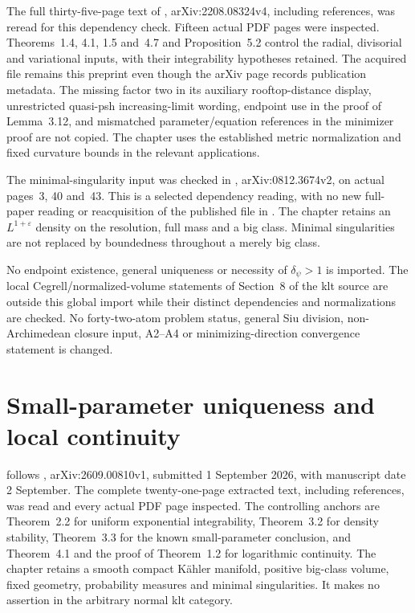 The full thirty-five-page text of
\cite{DarvasZhang24TwistedV4}, arXiv:2208.08324v4, including
references, was reread for this dependency check. Fifteen actual
PDF pages were inspected. Theorems~1.4, 4.1, 1.5 and~4.7 and
Proposition~5.2 control the radial, divisorial and variational
inputs, with their integrability hypotheses retained. The acquired
file remains this preprint even though the arXiv page records
publication metadata. The missing factor two in its auxiliary
rooftop-distance display, unrestricted quasi-psh increasing-limit
wording, endpoint use in the proof of Lemma~3.12, and mismatched
parameter/equation references in the minimizer proof are not copied.
The chapter uses the established metric normalization and fixed
curvature bounds in the relevant applications.

The minimal-singularity input was checked in
\cite[Theorem~B and Theorem~4.1]{BEGZ10BigV2},
arXiv:0812.3674v2, on actual pages~3, 40 and~43.
This is a selected dependency reading, with no new full-paper
reading or reacquisition of the published file in \cite{BEGZ10}.
The chapter retains an $L^{1+\varepsilon}$ density on the
resolution, full mass and a big class. Minimal singularities are
not replaced by boundedness throughout a merely big class.

No endpoint existence, general uniqueness or necessity of
$\delta_\psi>1$ is imported. The local Cegrell/normalized-volume
statements of Section~8 of the klt source are outside this global
import while their distinct dependencies and normalizations are
checked. No forty-two-atom problem status, general Siu division,
non-Archimedean closure input, A2--A4 or minimizing-direction
convergence statement is changed.

\section{Small-parameter uniqueness and local continuity}
\label{sec:provenance-big-small-uniqueness}

 follows
\cite{DangZhangZhou26UniquenessV1}, arXiv:2609.00810v1,
submitted 1 September 2026, with manuscript date 2 September.
The complete twenty-one-page extracted text, including references,
was read and every actual PDF page inspected. The controlling
anchors are Theorem~2.2 for uniform exponential integrability,
Theorem~3.2 for density stability, Theorem~3.3 for the known
small-parameter conclusion, and Theorem~4.1 and the proof of
Theorem~1.2 for logarithmic continuity. The chapter retains a
smooth compact K\"ahler manifold, positive big-class volume,
fixed geometry, probability measures and minimal singularities.
It makes no assertion in the arbitrary normal klt category.

